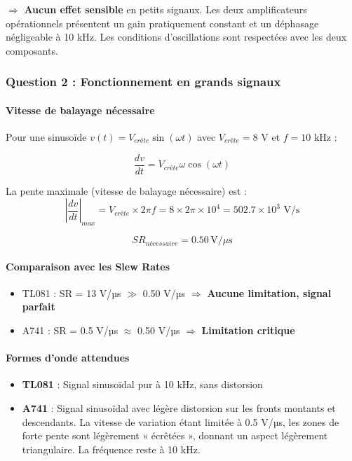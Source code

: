 \documentclass[11pt,a4paper]{article}
\begin{document}
$\Rightarrow$ \textbf{Aucun effet sensible} en petits signaux. Les deux amplificateurs opérationnels présentent un gain pratiquement constant et un déphasage négligeable à 10 kHz. Les conditions d'oscillations sont respectées avec les deux composants.

\subsubsection{Question 2 : Fonctionnement en grands signaux}

\paragraph{Vitesse de balayage nécessaire}

Pour une sinusoïde $v(t) = V_{crête} \sin(\omega t)$ avec $V_{crête} = 8$ V et $f = 10$ kHz :

\begin{equation}
\frac{dv}{dt} = V_{crête} \omega \cos(\omega t)
\end{equation}

La pente maximale (vitesse de balayage nécessaire) est :
\begin{equation}
\left|\frac{dv}{dt}\right|_{max} = V_{crête} \times 2\pi f = 8 \times 2\pi \times 10^4 = 502.7 \times 10^3 \text{ V/s}
\end{equation}

\begin{equation}
\boxed{SR_{nécessaire} = 0.50 \, \text{V}/\mu\text{s}}
\end{equation}

\paragraph{Comparaison avec les Slew Rates}

\begin{itemize}
    \item TL081 : SR = 13 V/µs $\gg$ 0.50 V/µs $\Rightarrow$ \textbf{Aucune limitation, signal parfait}
    \item A741 : SR = 0.5 V/µs $\approx$ 0.50 V/µs $\Rightarrow$ \textbf{Limitation critique}
\end{itemize}

\paragraph{Formes d'onde attendues}

\begin{itemize}
    \item \textbf{TL081} : Signal sinusoïdal pur à 10 kHz, sans distorsion
    \item \textbf{A741} : Signal sinusoïdal avec légère distorsion sur les fronts montants et descendants. La vitesse de variation étant limitée à 0.5 V/µs, les zones de forte pente sont légèrement « écrêtées », donnant un aspect légèrement triangulaire. La fréquence reste à 10 kHz.
\end{itemize}
\end{document}
